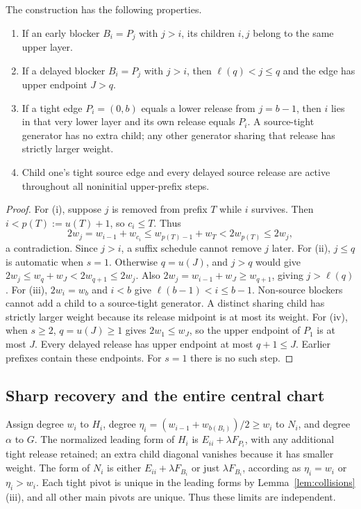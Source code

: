 \begin{lemma}\label{lem:collisions}
The construction has the following properties.
\begin{enumerate}[label=(\roman*),leftmargin=2em]
\item If an early blocker $B_i=P_j$ with $j>i$, its children $i,j$ belong to the same upper layer.
\item If a delayed blocker $B_i=P_j$ with $j>i$, then $\ell(q)<j\le q$ and the edge has upper endpoint $J>q$.
\item If a tight edge $P_i=(0,b)$ equals a lower release from $j=b-1$, then $i$ lies in that very lower layer and its own release equals $P_i$. A source-tight generator has no extra child; any other generator sharing that release has strictly larger weight.
\item Child one's tight source edge and every delayed source release are active throughout all noninitial upper-prefix steps.
\end{enumerate}
\end{lemma}
\begin{proof}
For (i), suppose $j$ is removed from prefix $T$ while $i$ survives. Then $i<p(T):=u(T)+1$, so $c_i\le T$. Thus
\[
2w_j=w_{i-1}+w_{c_i}\le w_{p(T)-1}+w_T<2w_{p(T)}\le2w_j,
\]
a contradiction. Since $j>i$, a suffix schedule cannot remove $j$ later.
For (ii), $j\le q$ is automatic when $s=1$. Otherwise $q=u(J)$, and $j>q$ would give $2w_j\le w_q+w_J<2w_{q+1}\le2w_j$. Also $2w_j=w_{i-1}+w_J\ge w_{q+1}$, giving $j>\ell(q)$.
For (iii), $2w_i=w_b$ and $i<b$ give $\ell(b-1)<i\le b-1$. Non-source blockers cannot add a child to a source-tight generator. A distinct sharing child has strictly larger weight because its release midpoint is at most its weight.
For (iv), when $s\ge2$, $q=u(J)\ge1$ gives $2w_1\le w_J$, so the upper endpoint of $P_1$ is at most $J$. Every delayed release has upper endpoint at most $q+1\le J$. Earlier prefixes contain these endpoints. For $s=1$ there is no such step.
\end{proof}

\subsection{Sharp recovery and the entire central chart}
Assign degree $w_i$ to $H_i$, degree $\eta_i=(w_{i-1}+w_{b(B_i)})/2\ge w_i$ to $N_i$, and degree $\alpha$ to $G$. The normalized leading form of $H_i$ is $E_{ii}+\lambda F_{P_i}$, with any additional tight release retained; an extra child diagonal vanishes because it has smaller weight. The form of $N_i$ is either $E_{ii}+\lambda F_{B_i}$ or just $\lambda F_{B_i}$, according as $\eta_i=w_i$ or $\eta_i>w_i$. Each tight pivot is unique in the leading forms by Lemma~\ref{lem:collisions}(iii), and all other main pivots are unique. Thus these limits are independent.

